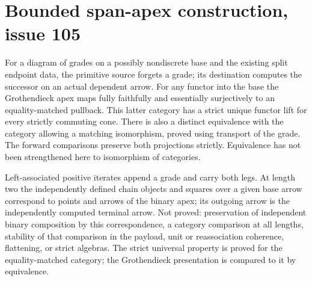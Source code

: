 \documentclass{article}
\begin{document}
\section*{Bounded span-apex construction, issue 105}
For a diagram of grades on a possibly nondiscrete base and the existing split endpoint data, the primitive source forgets a grade; its destination computes the successor on an actual dependent arrow. For any functor into the base the Grothendieck apex maps fully faithfully and essentially surjectively to an equality-matched pullback. This latter category has a strict unique functor lift for every strictly commuting cone. There is also a distinct equivalence with the category allowing a matching isomorphism, proved using transport of the grade. The forward comparisons preserve both projections strictly. Equivalence has not been strengthened here to isomorphism of categories.
\par Left-associated positive iterates append a grade and carry both legs. At length two the independently defined chain objects and squares over a given base arrow correspond to points and arrows of the binary apex; its outgoing arrow is the independently computed terminal arrow. Not proved: preservation of independent binary composition by this correspondence, a category comparison at all lengths, stability of that comparison in the payload, unit or reassociation coherence, flattening, or strict algebras. The strict universal property is proved for the equality-matched category; the Grothendieck presentation is compared to it by equivalence.
\end{document}
